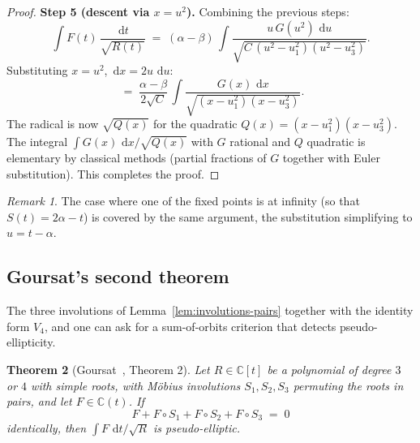 \documentclass[11pt,a4paper]{article}
\theoremstyle{plain}
\newtheorem{theorem}{Theorem}[section]
\theoremstyle{definition}
\theoremstyle{remark}
\newtheorem{remark}[theorem]{Remark}
\newcommand{\C}{\mathbb{C}}
\renewcommand{\d}{\,\mathrm{d}}
\begin{document}
\begin{proof}
\smallskip\noindent
\textbf{Step 5 (descent via $x = u^2$).}
Combining the previous steps:
\[
  \int F(t)\,\frac{\d t}{\sqrt{R(t)}}
  \;=\; (\alpha-\beta)\,\int \frac{u\,G(u^2)\,\d u}{\sqrt{C\,(u^2-u_1^2)(u^2-u_3^2)}}.
\]
Substituting $x=u^2$, $\d x = 2u\,\d u$:
\[
  \;=\; \frac{\alpha-\beta}{2\sqrt{C}}\,\int \frac{G(x)\,\d x}{\sqrt{(x-u_1^2)(x-u_3^2)}}.
\]
The radical is now $\sqrt{Q(x)}$ for the quadratic $Q(x)=(x-u_1^2)(x-u_3^2)$. The integral $\int G(x)\,\d x/\sqrt{Q(x)}$ with $G$ rational and $Q$ quadratic is elementary by classical methods (partial fractions of $G$ together with Euler substitution). This completes the proof.
\end{proof}

\begin{remark}
The case where one of the fixed points is at infinity (so that $S(t) = 2\alpha - t$) is covered by the same argument, the substitution simplifying to $u = t-\alpha$.
\end{remark}

\subsection{Goursat's second theorem}

The three involutions of Lemma~\ref{lem:involutions-pairs} together with the identity form $V_4$, and one can ask for a sum-of-orbits criterion that detects pseudo-ellipticity.

\begin{theorem}[Goursat~\cite{Goursat1887}, Theorem 2]\label{thm:goursat2}
Let $R\in\C[t]$ be a polynomial of degree $3$ or $4$ with simple roots, with M\"obius involutions $S_1,S_2,S_3$ permuting the roots in pairs, and let $F\in\C(t)$. If
\begin{equation}\label{eq:V4-sum}
  F + F\circ S_1 + F\circ S_2 + F\circ S_3 \;=\; 0
\end{equation}
identically, then $\int F\,\d t/\sqrt{R}$ is pseudo-elliptic.
\end{theorem}
\end{document}
